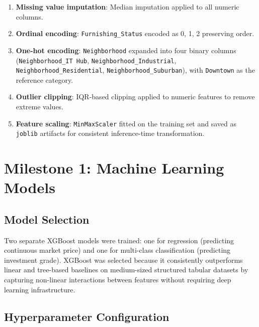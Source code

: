 \documentclass[12pt,a4paper]{article}
\begin{document}
\begin{enumerate}[leftmargin=1.5em]
  \item \textbf{Missing value imputation}: Median imputation applied to all numeric columns.
  \item \textbf{Ordinal encoding}: \texttt{Furnishing\_Status} encoded as 0, 1, 2 preserving order.
  \item \textbf{One-hot encoding}: \texttt{Neighborhood} expanded into four binary columns (\texttt{Neighborhood\_IT Hub}, \texttt{Neighborhood\_Industrial}, \texttt{Neighborhood\_Residential}, \texttt{Neighborhood\_Suburban}), with \texttt{Downtown} as the reference category.
  \item \textbf{Outlier clipping}: IQR-based clipping applied to numeric features to remove extreme values.
  \item \textbf{Feature scaling}: \texttt{MinMaxScaler} fitted on the training set and saved as \texttt{joblib} artifacts for consistent inference-time transformation.
\end{enumerate}

\section{Milestone 1: Machine Learning Models}

\subsection{Model Selection}

Two separate XGBoost models were trained: one for regression (predicting continuous market price) and one for multi-class classification (predicting investment grade). XGBoost was selected because it consistently outperforms linear and tree-based baselines on medium-sized structured tabular datasets by capturing non-linear interactions between features without requiring deep learning infrastructure.

\subsection{Hyperparameter Configuration}
\end{document}
